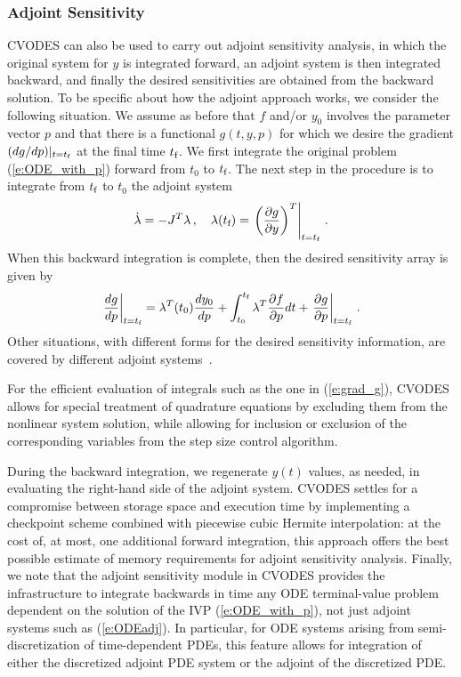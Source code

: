 \subsubsection{Adjoint Sensitivity}
CVODES can also be used to carry out adjoint sensitivity analysis,
in which the original system for $y$ is integrated forward,
an adjoint system is then integrated backward, and finally the desired
sensitivities are obtained from the backward solution.
To be specific about how the adjoint approach works, we consider
the following situation. We assume as before that $f$ and/or $y_0$
involves the parameter vector $p$ and that there is a
functional $g(t,y,p)$ for which we desire the
gradient $(dg/dp)|_{t=t_{\mbox{\tiny f}}}$
at the final time $t_{\mbox{\scriptsize f}}$.
We first integrate the original problem (\ref{e:ODE_with_p}) forward
from $t_0$ to $t_{\mbox{\scriptsize f}}$. The next step in the procedure is to integrate
from $t_{\mbox{\scriptsize f}}$ to $t_0$ the adjoint system
\begin{equation}\label{e:ODEadj}
  \dot{\lambda} = -J^T \lambda \, , \quad
  \lambda(t_{\mbox{\scriptsize f}}) = \left. \left( \frac{\partial g}{\partial y}
    \right)^T \right| _{t=t_{\mbox{\tiny f}}} \, .
\end{equation}
When this backward integration is complete, then the desired
sensitivity array is given by
\begin{equation}\label{e:grad_g}
  \left. \frac{dg}{dp}\right|_{t=t_{\mbox{\tiny f}}} =
  \lambda^T(t_0) \frac{dy_0}{dp}
  + \int_{t_0}^{t_{\mbox{\tiny f}}} \lambda^T \frac{\partial f}{\partial p} dt +
  \left. \frac{\partial g}{\partial p} \right|_{t=t_{\mbox{\tiny f}}} \, .
\end{equation}
Other situations, with different forms for the desired sensitivity
information, are covered by different adjoint systems~\cite{CLPS:03}.

For the efficient evaluation of integrals such as the one in (\ref{e:grad_g}),
CVODES allows for special treatment of quadrature equations by excluding them
from the nonlinear system solution, while allowing for inclusion or exclusion
of the corresponding variables from the step size control algorithm.

During the backward integration, we regenerate $y(t)$ values, as needed,
in evaluating the right-hand side of the adjoint system.
%
CVODES settles for a compromise between storage space and execution time
by implementing a checkpoint scheme combined with piecewise cubic Hermite
interpolation: at the cost of, at most, one additional forward integration,
this approach offers the best possible estimate of memory requirements for
adjoint sensitivity analysis.
%
Finally, we note that the adjoint sensitivity module in CVODES provides
the infrastructure to integrate backwards in time any ODE terminal-value
problem dependent on the solution of the IVP (\ref{e:ODE_with_p}),
not just adjoint systems such as (\ref{e:ODEadj}). In particular,
for ODE systems arising from semi-discretization of time-dependent PDEs,
this feature allows for integration of either the discretized adjoint
PDE system or the adjoint of the discretized PDE.

